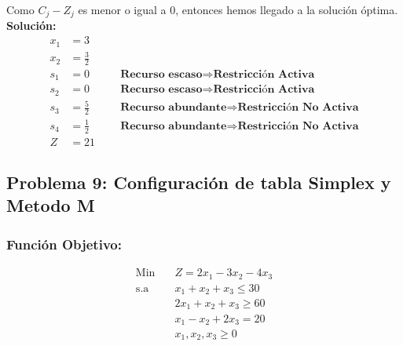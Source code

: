 \documentclass{templateNote}
\begin{document}
Como $C_j - Z_j$ es menor o igual a 0, entonces hemos llegado a la solución óptima.
\textbf{Solución:}
\begin{align*}
    x_1 &= 3 \\
    x_2 &= \displaystyle\frac{3}{2} \\
    s_1 &= 0 \qquad &\textbf{Recurso escaso} \Rightarrow \textbf{Restricción Activa}\\
    s_2 &= 0 \qquad &\textbf{Recurso escaso} \Rightarrow \textbf{Restricción Activa}\\
    s_3 &= \displaystyle\frac{5}{2} \qquad &\textbf{Recurso abundante} \Rightarrow \textbf{Restricción No Activa}\\
    s_4 &= \displaystyle\frac{1}{2} \qquad &\textbf{Recurso abundante} \Rightarrow \textbf{Restricción No Activa}\\
    Z &= 21
\end{align*}

\newpage
\subsection*{Problema 9: Configuración de tabla Simplex y Metodo M}

\subsubsection*{Función Objetivo:}
\begin{equation*}
    \begin{aligned}
        \text{Min} \quad & Z = 2x_1 - 3x_2 - 4x_3\\
        \text{s.a} \quad & x_1 + x_2 + x_3 \leq 30 \\
        & 2x_1 + x_2 + x_3 \geq 60 \\
        & x_1 - x_2 + 2x_3 = 20 \\
        & x_1, x_2, x_3 \geq 0
    \end{aligned}
\end{equation*}
\end{document}
